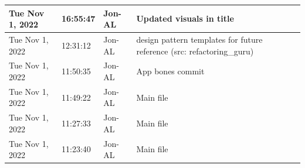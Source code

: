 \documentclass[11pt]{article}
\begin{document}
\begin{center}
\begin{longtable}{|p{2.7cm}|l|p{2cm}|p{8cm}|}
           \hline Tue Nov 1, 2022                            & 16:55:47                           & Jon-AL                                  & Updated visuals in title                                                                                                                                                                                                                                                                                   \\
           \hline Tue Nov 1, 2022                            & 12:31:12                           & Jon-AL                                  & design pattern templates for future reference (src: refactoring\_guru)                                                                                                                                                                                                                                      \\
           \hline Tue Nov 1, 2022                            & 11:50:35                           & Jon-AL                                  & App bones commit                                                                                                                                                                                                                                                                                           \\
           \hline Tue Nov 1, 2022                            & 11:49:22                           & Jon-AL                                  & Main file                                                                                                                                                                                                                                                                                                  \\
           \hline Tue Nov 1, 2022                            & 11:27:33                           & Jon-AL                                  & Main file                                                                                                                                                                                                                                                                                                  \\
           \hline Tue Nov 1, 2022                            & 11:23:40                           & Jon-AL                                  & Main file                                                                                                                                                                                                                                                                                                  \\

\end{longtable}
\end{center}
\end{document}
